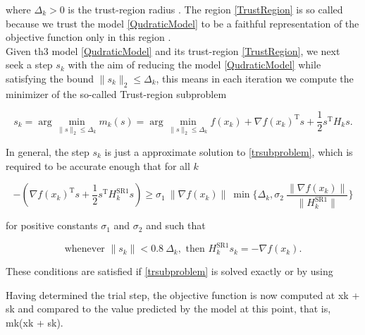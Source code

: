 where $\Delta_k > 0$ is the trust-region radius \cite[p.~115]{ConnGouldToint:2000}. The region \cref{TrustRegion} is so called because we trust the model \cref{QudraticModel} to be a faithful representation of the objective function only in this region \cite[p.~2]{ConnGouldToint:2000}. \\
Given th3 model \cref{QudraticModel} and its trust-region \cref{TrustRegion}, we next seek a step $s_k$ with the aim of reducing the model \cref{QudraticModel} while satisfying the bound $\lVert s_k \rVert_2 \leq \Delta_k$, this means in each iteration we compute the minimizer of the so-called Trust-region subproblem

\begin{equation}\label{trsubproblem}
    s_k = \arg \min_{\lVert s \rVert_2 \leq \Delta_k} m_k(s) = \arg \min_{\lVert s \rVert_2 \leq \Delta_k} f(x_k) + \nabla f(x_k)^{\mathrm{T}} s + \frac{1}{2} s^{\mathrm{T}} H_k s.
\end{equation}

In general, the step $s_k$ is just a approximate solution to \cref{trsubproblem}, which is required to be accurate enough that for all $k$

\begin{equation}\label{accuracy1}
    -(\nabla f(x_k)^{\mathrm{T}} s + \frac{1}{2} s^{\mathrm{T}} H^{\mathrm{SR1}}_k s) \geq \sigma_1 \ \lVert \nabla f(x_k) \rVert \ \min \{ \Delta_k, \sigma_2 \ \frac{\lVert \nabla f(x_k) \rVert}{\lVert H^{\mathrm{SR1}}_k \rVert} \} 
\end{equation} 

for positive constants $\sigma_1$ and $\sigma_2$ and such that 

\begin{equation}\label{accuracy2}
    \text{whenever } \lVert s_k \rVert < 0.8 \ \Delta_k, \text{ then } H^{\mathrm{SR1}}_k s_k = - \nabla f(x_k).
\end{equation}

These conditions are satisfied if \cref{trsubproblem} is solved exactly or by using 

Having determined the trial step, the objective function is now computed
at xk + sk and compared to the value predicted by the model at this point, that is,
mk(xk + sk).






